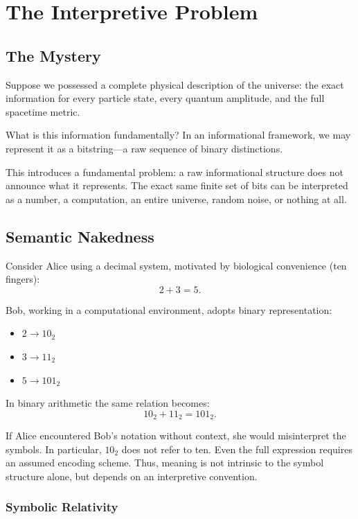 \chapter{The Interpretive Problem}
\label{chap:interpretation-problem}

\section{The Mystery}

Suppose we possessed a complete physical description of the universe:
the exact information for every particle state, every quantum amplitude, and the full spacetime metric.

What is this information fundamentally? In an informational framework, we may represent it as a bitstring—a raw sequence of binary distinctions.

This introduces a fundamental problem: a raw informational structure does not announce what it represents.
The exact same finite set of bits can be interpreted as a number, a computation, an entire universe, random noise, or nothing at all.



\section{Semantic Nakedness}

Consider Alice using a decimal system, motivated by biological convenience (ten fingers):
\[
2 + 3 = 5.
\]

Bob, working in a computational environment, adopts binary representation:
\begin{itemize}
\item $2 \rightarrow 10_2$
\item $3 \rightarrow 11_2$
\item $5 \rightarrow 101_2$
\end{itemize}

In binary arithmetic the same relation becomes:
\[
10_2 + 11_2 = 101_2.
\]

If Alice encountered Bob's notation without context, she would misinterpret the symbols.
In particular, $10_2$ does not refer to ten.
Even the full expression requires an assumed encoding scheme.
Thus, meaning is not intrinsic to the symbol structure alone, but depends on an interpretive convention.

\subsection*{Symbolic Relativity}

